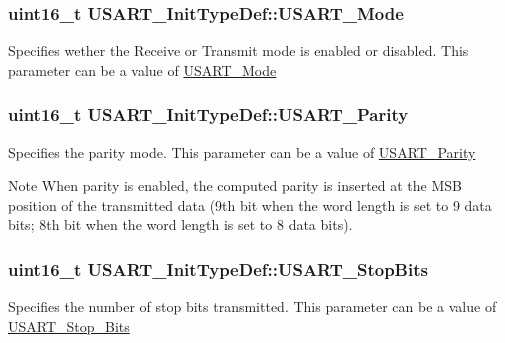 \subsubsection[{\texorpdfstring{U\+S\+A\+R\+T\+\_\+\+Mode}{USART_Mode}}]{\setlength{\rightskip}{0pt plus 5cm}uint16\+\_\+t U\+S\+A\+R\+T\+\_\+\+Init\+Type\+Def\+::\+U\+S\+A\+R\+T\+\_\+\+Mode}\hypertarget{struct_u_s_a_r_t___init_type_def_a7d944d35d7d1fc79a63f249615148584}{}\label{struct_u_s_a_r_t___init_type_def_a7d944d35d7d1fc79a63f249615148584}
Specifies wether the Receive or Transmit mode is enabled or disabled. This parameter can be a value of \hyperlink{group___u_s_a_r_t___mode}{U\+S\+A\+R\+T\+\_\+\+Mode} 
\subsubsection[{\texorpdfstring{U\+S\+A\+R\+T\+\_\+\+Parity}{USART_Parity}}]{\setlength{\rightskip}{0pt plus 5cm}uint16\+\_\+t U\+S\+A\+R\+T\+\_\+\+Init\+Type\+Def\+::\+U\+S\+A\+R\+T\+\_\+\+Parity}\hypertarget{struct_u_s_a_r_t___init_type_def_a5ae66aba755bac37c5cf0dfbf529e2ed}{}\label{struct_u_s_a_r_t___init_type_def_a5ae66aba755bac37c5cf0dfbf529e2ed}
Specifies the parity mode. This parameter can be a value of \hyperlink{group___u_s_a_r_t___parity}{U\+S\+A\+R\+T\+\_\+\+Parity} \begin{DoxyNote}{Note}
When parity is enabled, the computed parity is inserted at the M\+SB position of the transmitted data (9th bit when the word length is set to 9 data bits; 8th bit when the word length is set to 8 data bits). 
\end{DoxyNote}
\subsubsection[{\texorpdfstring{U\+S\+A\+R\+T\+\_\+\+Stop\+Bits}{USART_StopBits}}]{\setlength{\rightskip}{0pt plus 5cm}uint16\+\_\+t U\+S\+A\+R\+T\+\_\+\+Init\+Type\+Def\+::\+U\+S\+A\+R\+T\+\_\+\+Stop\+Bits}\hypertarget{struct_u_s_a_r_t___init_type_def_ac745bceb79a6c4c2640fd8e8ce6639d6}{}\label{struct_u_s_a_r_t___init_type_def_ac745bceb79a6c4c2640fd8e8ce6639d6}
Specifies the number of stop bits transmitted. This parameter can be a value of \hyperlink{group___u_s_a_r_t___stop___bits}{U\+S\+A\+R\+T\+\_\+\+Stop\+\_\+\+Bits} 
